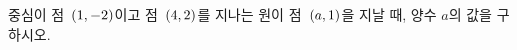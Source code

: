 중심이 점~$(1{,}\mkern3mu\mathopen{}-2)$이고 점~$(4{,}\mkern3mu\mathopen{}2)$를 지나는 원이 점~$(a{,}\mkern3mu\mathopen{}1)$을 지날 때, 양수 $a$의 값을 구하시오.
